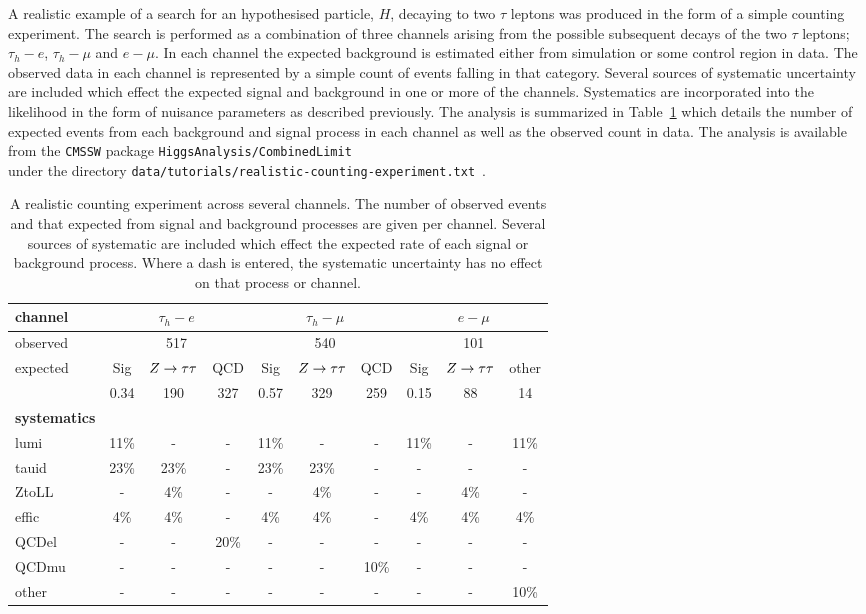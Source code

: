 A realistic example of a search for an hypothesised particle, $H$, 
decaying to two $\tau$ leptons was produced in the form 
of a simple counting experiment. The search is performed as a combination of 
three channels arising from the possible subsequent 
decays of the two $\tau$ leptons; $\tau_{h}-e$, $\tau_{h}-\mu$ and $e-\mu$. 
In each channel the expected background is estimated
either from simulation or some control region in data. 
The observed data in each channel is represented by a simple count of events 
falling in that category.
Several sources of systematic uncertainty are included which effect the
expected signal and background in one or more of the channels. 
Systematics are incorporated into the likelihood in the form of nuisance 
parameters as described previously. The analysis is summarized in 
Table~\ref{tab:realanalysis} which details the number of expected events 
from each background and signal process in each channel as well as the 
observed count in data. 
The analysis is available from the \texttt{CMSSW} package \texttt{HiggsAnalysis/CombinedLimit}\\
under the directory \texttt{data/tutorials/realistic-counting-experiment.txt}~\cite{null}.

\begin{table}
\centering
\begin{tabular}{|l|c|c|c|c|c|c|c|c|c|}
\hline
\textbf{channel} & \multicolumn{3}{c|}{$\tau_{h}-e$} & \multicolumn{3}{|c|}{$\tau_{h}-\mu$} 
&\multicolumn{3}{c|}{$e-\mu$}   	\\ \hline
observed & \multicolumn{3}{c}{517} &\multicolumn{3}{|c|}{540} & \multicolumn{3}{c|}{101} \\ \hline
expected & Sig & $Z\rightarrow\tau\tau$ & QCD & Sig & $Z\rightarrow\tau\tau$ & QCD &Sig & $Z\rightarrow\tau\tau$ & other 		\\ \hline
	 & 0.34 & 190 & 327 &  0.57 & 329 & 259 & 0.15 & 88 & 14			\\ \hline
\hline
\textbf{systematics} & \multicolumn{9}{c|}{} \\ \hline
lumi	 & 11\% & - & - & 11\% & - & - & 11\% & - & 11\% 	\\ \hline 
tauid	 & 23\% & 23\% & - & 23\% & 23\% & - & - & - & -  	\\ \hline 
ZtoLL    & - & 4\% & - & - & 4\% & - & - & 4\% & - 		\\ \hline
effic    & 4\% & 4\%&  - & 4\% & 4\% & - & 4\% & 4\% & 4\%	\\ \hline  
QCDel	 & - & - & 20\% & - & - & - & - & - & - 		\\ \hline
QCDmu    & - & - & - & - & - & 10\% & - & - & -			\\ \hline
other    & - & - & - & - & - & - & - & - & 10\%			\\ \hline
\end{tabular}
\caption{A realistic counting experiment across several channels. 
The number of observed events and that expected from signal and background
processes are given per channel. Several sources of systematic are included 
which effect the expected rate of each signal or background process. 
Where a dash is entered, the systematic uncertainty has no effect on that 
process or channel. \label{tab:realanalysis}}
\end{table}

